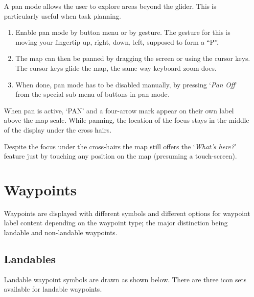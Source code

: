 A pan mode allows the user to explore areas beyond the glider.  This
is particularly useful when task planning.
\begin{enumerate}
\item Enable pan mode by button menu or by gesture.  The gesture for this is moving your fingertip up, right, down, left, supposed to form a ``P''.
\item The map can then be panned by dragging the screen or using the cursor
  keys.  The cursor keys glide the map, the same way keyboard zoom does.
\item When done, pan mode has to be disabled manually, by pressing `\emph{Pan Off}' 
  from the special sub-menu of buttons in pan mode.
\end{enumerate} 

When pan is active, `PAN' and a four-arrow mark appear on their own
label above the map scale.  While panning, the location of the focus
stays in the middle of the display under the cross hairs. 

Despite the focus under the cross-hairs the map
still offers the `\emph{What's here?}' feature just by touching any 
position on the map (presuming a touch-screen).


\section{Waypoints}\label{sec:waypoint-schemes}
Waypoints are displayed with different symbols and different options for
waypoint label content depending on the
waypoint type; the major distinction being landable and non-landable
waypoints.

\subsection*{Landables}
Landable waypoint symbols are drawn as shown below. There are three icon sets
available for landable waypoints. 

